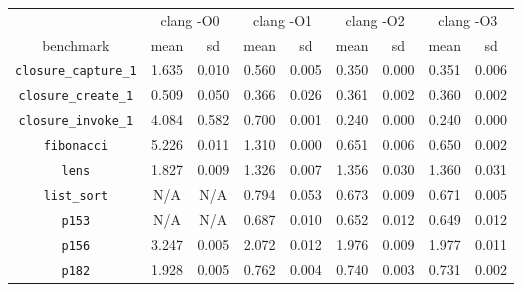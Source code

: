 \documentclass[12pt,a4paper,twoside,openright]{report}
\begin{document}
\begin{table}[h]
  \centering
  \small
\begin{tabular}{| c | c c | c c | c c | c c |}
  \hline
  & \multicolumn{2}{c|}{clang -O0}
  & \multicolumn{2}{c|}{clang -O1}
  & \multicolumn{2}{c|}{clang -O2}
  & \multicolumn{2}{c|}{clang -O3}
  \\
benchmark                     & mean  & sd    & mean  & sd    & mean  & sd    & mean  & sd \\
  \hline
\lstinline!closure_capture_1! & \cellcolor[hsb]{0.3,0.097,1}1.635 & 0.010 & \cellcolor[hsb]{0.3,0.691,1}0.560 & 0.005 & \cellcolor[hsb]{0.3,0.807,1}0.350 & 0.000 & \cellcolor[hsb]{0.3,0.806,1}0.351 & 0.006 \\
\lstinline!closure_create_1!  & \cellcolor[hsb]{0.0,1.000,1}0.509 & 0.050 & \cellcolor[hsb]{0.0,0.642,1}0.366 & 0.026 & \cellcolor[hsb]{0.0,0.626,1}0.361 & 0.002 & \cellcolor[hsb]{0.0,0.625,1}0.360 & 0.002 \\
\lstinline!closure_invoke_1!  & \cellcolor[hsb]{0.0,0.432,1}4.084 & 0.582 & \cellcolor[hsb]{0.3,0.680,1}0.700 & 0.001 & \cellcolor[hsb]{0.3,0.890,1}0.240 & 0.000 & \cellcolor[hsb]{0.3,0.890,1}0.240 & 0.000 \\
\lstinline!fibonacci!         & \cellcolor[hsb]{0.0,0.326,1}5.226 & 0.011 & \cellcolor[hsb]{0.3,0.586,1}1.310 & 0.000 & \cellcolor[hsb]{0.3,0.794,1}0.651 & 0.006 & \cellcolor[hsb]{0.3,0.794,1}0.650 & 0.002 \\
\lstinline!lens!              & \cellcolor[hsb]{0.0,1.000,1}1.827 & 0.009 & \cellcolor[hsb]{0.0,1.000,1}1.326 & 0.007 & \cellcolor[hsb]{0.0,1.000,1}1.356 & 0.030 & \cellcolor[hsb]{0.0,1.000,1}1.360 & 0.031 \\
\lstinline!list_sort!         &                                N/A &    N/A & \cellcolor[hsb]{0.3,0.292,1}0.794 & 0.053 & \cellcolor[hsb]{0.3,0.400,1}0.673 & 0.009 & \cellcolor[hsb]{0.0,0.402,1}0.671 & 0.005 \\
\lstinline!p153!              &                                N/A &    N/A & \cellcolor[hsb]{0.0,0.357,1}0.687 & 0.010 & \cellcolor[hsb]{0.0,0.314,1}0.652 & 0.012 & \cellcolor[hsb]{0.0,0.310,1}0.649 & 0.012 \\
\lstinline!p156!              & \cellcolor[hsb]{0.0,1.000,1}3.247 & 0.005 & \cellcolor[hsb]{0.0,0.511,1}2.072 & 0.012 & \cellcolor[hsb]{0.0,0.464,1}1.976 & 0.009 & \cellcolor[hsb]{0.0,0.465,1}1.977 & 0.011 \\
\lstinline!p182!              & \cellcolor[hsb]{0.0,0.368,1}1.928 & 0.005 & \cellcolor[hsb]{0.3,0.314,1}0.762 & 0.004 & \cellcolor[hsb]{0.3,0.334,1}0.740 & 0.003 & \cellcolor[hsb]{0.3,0.342,1}0.731 & 0.002 \\

\end{tabular}
\end{table}
\end{document}
